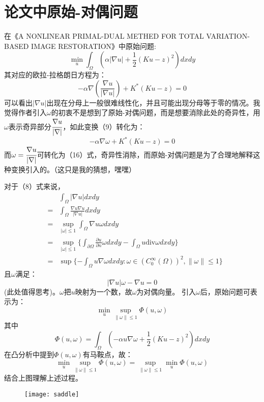 \documentclass[a4paper,12pt]{article}
\begin{document}
\section{论文中原始-对偶问题}
在《A NONLINEAR PRIMAL-DUAL METHED FOR TOTAL VARIATION-BASED IMAGE RESTORATION》中原始问题:
\begin{equation}
\min_u \int_{\Omega}(\alpha|\nabla u|+\frac{1}{2}(Ku-z)^2)dxdy
\end{equation}
其对应的欧拉-拉格朗日方程为：
\begin{equation}
-\alpha \nabla(\frac{\nabla u}{|\nabla u|})+K^*(Ku-z)=0
\end{equation}
可以看出$|\nabla u|$出现在分母上一般很难线性化，并且可能出现分母等于零的情况。我觉得作者引入$\omega$的初衷不是想到了原始-对偶问题，而是想要消除此处的奇异性，用$\omega$表示奇异部分$\cfrac{\nabla u}{|\nabla|}$，如此变换（9）转化为：
\begin{equation}
-\alpha \nabla \omega+K^*(Ku-z)=0
\end{equation}
而$\omega=\cfrac{\nabla u}{|\nabla|}$可转化为（16）式，奇异性消除，而原始-对偶问题是为了合理地解释这种变换引入的。（这只是我的猜想，嘿嘿）

对于（8）式来说，
\begin{eqnarray}
&&\int_{\Omega}|\nabla u|dxdy\\
&=&\int_{\Omega}\frac{\nabla u\nabla u}{|\nabla u|}dxdy\\
&=&\sup_{|\omega|\le 1}\int_{\Omega}\nabla u \omega dxdy\\
&=&\sup_{|\omega|\le 1}\{\int_{\partial\Omega}\frac{\partial u}{\partial n} \omega dxdy-\int_{\Omega}u \textrm{div}\omega dxdy\}\\
&=&\sup \{-\int_{\Omega}u\nabla \omega dxdy:\omega \in(C^{\infty}_0(\Omega))^2,\parallel \omega \parallel \le 1\}
\end{eqnarray}
且$\omega$满足：
\begin{equation}
|\nabla u|\omega-\nabla u=0
\end{equation}
(此处值得思考)。$\omega$把$u$映射为一个数，故$\omega$为对偶向量。
引入$\omega$后，原始问题可表示为：
\begin{equation}
\min_u \sup_{\parallel \omega \parallel \le 1}\Phi(u,\omega)
\end{equation}
其中
\begin{equation}
\Phi(u,\omega)=\int_{\Omega}(-\alpha u \nabla \omega+\frac{1}{2}(Ku-z)^2)dxdy
\end{equation}
在凸分析中提到$\Phi(u,\omega)$有马鞍点，故：
\begin{equation}
\min_u \sup_{\parallel \omega \parallel \le 1}\Phi(u,\omega)=\sup_{\parallel \omega \parallel \le 1}\min_u \Phi(u,\omega)
\end{equation}
结合上图理解上述过程。
\begin{figure}
 \texttt{[image: saddle]}
\end{figure}
\end{document}

